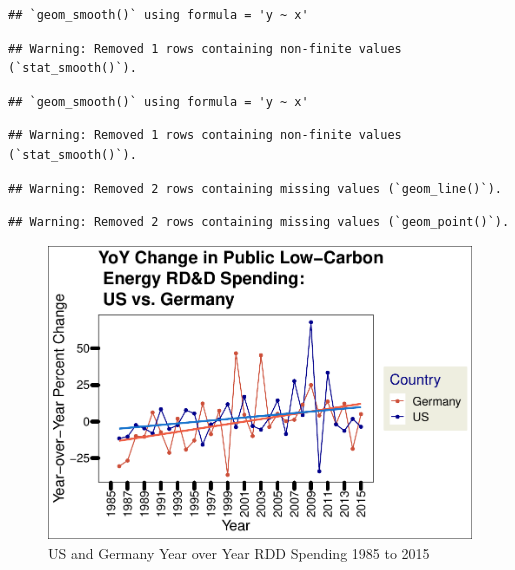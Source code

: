 \documentclass[
  12pt,
]{article}
\begin{document}
\begin{verbatim}
## `geom_smooth()` using formula = 'y ~ x'
\end{verbatim}

\begin{verbatim}
## Warning: Removed 1 rows containing non-finite values (`stat_smooth()`).
\end{verbatim}

\begin{verbatim}
## `geom_smooth()` using formula = 'y ~ x'
\end{verbatim}

\begin{verbatim}
## Warning: Removed 1 rows containing non-finite values (`stat_smooth()`).
\end{verbatim}

\begin{verbatim}
## Warning: Removed 2 rows containing missing values (`geom_line()`).
\end{verbatim}

\begin{verbatim}
## Warning: Removed 2 rows containing missing values (`geom_point()`).
\end{verbatim}

\begin{figure}
\centering
\includegraphics{Chang_Jenkins_Mullens_ENV872_Final_files/figure-latex/visualizing the US and Germany data together-1.pdf}
\caption{US and Germany Year over Year RDD Spending 1985 to 2015}
\end{figure}
\end{document}
